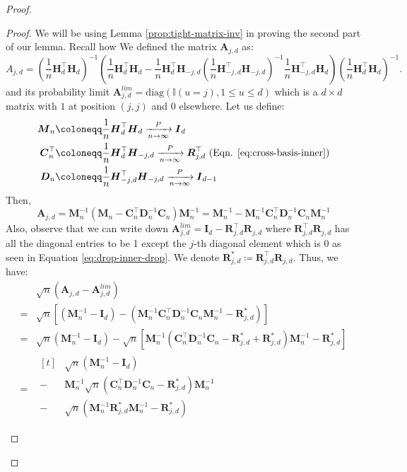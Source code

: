 \documentclass[
  12pt]{article}
\newcommand{\pnlim}{\xrightarrow[n \to \infty]{P}}
\newcommand{\bR}{\boldsymbol{R}}
\newcommand{\bD}{\boldsymbol{D}}
\newcommand{\bM}{\boldsymbol{M}}
\newcommand{\bA}{\boldsymbol{A}}
\newcommand{\bC}{\boldsymbol{C}}
\newcommand{\bI}{\boldsymbol{I}}
\newcommand{\bH}{\boldsymbol{H}}
\begin{document}
\begin{proof}
\begin{proof}
We will be using Lemma \ref{prop:tight-matrix-inv} in proving the second part of our lemma. Recall how We defined the matrix $\bA_{j,d}$ as:
$$
A_{j,d} = \left(\frac{1}{n} \bH_d^\top \bH_d \right)^{-1} \left( \frac{1}{n} \bH_d^\top \bH_d - \frac{1}{n} \bH_d^\top \bH_{-j,d} \left( \frac{1}{n} \bH_{-j,d}^\top \bH_{-j,d} \right)^{-1} \frac{1}{n} \bH_{-j,d}^\top \bH_d \right) \left(\frac{1}{n} \bH_d^\top \bH_d \right)^{-1}.
$$
and its probability limit $\bA_{j,d}^{lim} = \text{diag}(\mathbb{I}(u = j), 1 \leq u \leq d)$ which is a $d \times d$ matrix with $1$ at position $(j,j)$ and $0$ elsewhere. Let us define:
$$
\begin{aligned}
    \bM_n \coloneqq & \frac{1}{n} \bH_d^\top \bH_d \pnlim \bI_d\\
\bC_n^\top \coloneqq & \frac{1}{n} \bH_d^\top \bH_{-j,d} \pnlim \bR^\top_{j,d} \text{ (Eqn. \ref{eq:cross-basis-inner})}\\
\bD_n \coloneqq &\frac{1}{n} \bH_{-j,d}^\top \bH_{-j,d} \pnlim \bI_{d-1}    
\end{aligned}
$$
Then,
$$
\bA_{j,d} = \bM_n^{-1} \left(\bM_n - \bC_n^\top \bD_n^{-1} \bC_n\right) \bM_n^{-1} = \bM_n^{-1} - \bM_n^{-1}\bC_n^\top \bD_n^{-1} \bC_n \bM_n^{-1}
$$
Also, observe that we can write down $\bA_{j,d}^{lim} = \bI_d - \bR^\top_{j,d}\bR_{j,d}$ where $\bR^\top_{j,d}\bR_{j,d}$ has all the diagonal entries to be 1 except the $j$-th diagonal element which is 0 as seen in Equation \ref{eq:drop-inner-drop}. We denote $\bR^*_{j,d}\coloneqq \bR^\top_{j,d}\bR_{j,d}$. Thus, we have:
\begin{equation}
    \begin{split}
        & \sqrt{n}\left(\bA_{j,d} - \bA^{lim}_{j,d}\right)\\
        = & \sqrt{n}\left[\left(\bM_n^{-1} - \bI_d\right) - \left(\bM_n^{-1}\bC_n^\top \bD_n^{-1} \bC_n \bM_n^{-1} - \bR^*_{j,d}\right)\right]\\
        = & \sqrt{n}\left(\bM_n^{-1} - \bI_d\right) - \sqrt{n}\left[\bM_n^{-1}(\bC_n^\top \bD_n^{-1} \bC_n - \bR^*_{j,d} + \bR^*_{j,d})\bM_n^{-1} - \bR^*_{j,d}\right]\\
        = & \!\begin{aligned}[t]
        & \sqrt{n}\left(\bM_n^{-1} - \bI_d\right)\\
        - & \bM_n^{-1}\sqrt{n}\left(\bC_n^\top \bD_n^{-1} \bC_n - \bR^*_{j,d}\right)\bM_n^{-1}\\
        - &\sqrt{n}\left(\bM_n^{-1}\bR^*_{j,d}\bM_n^{-1} - \bR^*_{j,d}\right) \\
    \end{aligned}\\

\end{split}
\end{equation}
\end{proof}
\end{proof}
\end{document}
